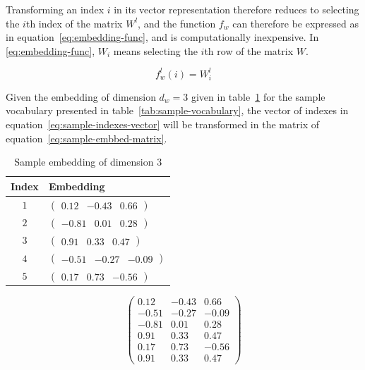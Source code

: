 Transforming an index $i$ in its vector representation therefore reduces to
selecting the $i$th index of the matrix $W^l$, and the function $f_w$ can
therefore be expressed as in equation~\ref{eq:embedding-func}, and is
computationally inexpensive. In \ref{eq:embedding-func}, $W_i$ means selecting
the $i$th row of the matrix $W$.

\begin{equation}
  \label{eq:embedding-func}
  f_w^l(i) = W_i^l
\end{equation}

Given the embedding of dimension $d_w = 3$ given in table~\ref{tab:sample-embedding}
for the sample vocabulary presented in table~\ref{tab:sample-vocabulary}, the
vector of indexes in equation~\ref{eq:sample-indexes-vector} will be transformed
in the matrix of equation~\ref{eq:sample-embbed-matrix}.

\begin{table}
  \centering
  \begin{tabular}{cl}
    Index & Embedding\\
    \toprule
    $1$ & $\begin{pmatrix}0.12 & -0.43 & 0.66\end{pmatrix}$\\
    $2$ & $\begin{pmatrix}-0.81 & 0.01 & 0.28\end{pmatrix}$\\
    $3$ & $\begin{pmatrix}0.91 & 0.33 & 0.47\end{pmatrix}$\\
    $4$ & $\begin{pmatrix}-0.51 & -0.27 & -0.09\end{pmatrix}$\\
    $5$ & $\begin{pmatrix}0.17 & 0.73 & -0.56\end{pmatrix}$\\
  \end{tabular}
  \caption{\label{tab:sample-embedding} Sample embedding of dimension $3$}
\end{table}

\begin{equation}
  \label{eq:sample-embbed-matrix}
  \begin{pmatrix}
    0.12 & -0.43 & 0.66\\
    -0.51 & -0.27 & -0.09\\
    -0.81 & 0.01 & 0.28\\
    0.91 & 0.33 & 0.47\\
    0.17 & 0.73 & -0.56\\
    0.91 & 0.33 & 0.47
  \end{pmatrix}
\end{equation}

